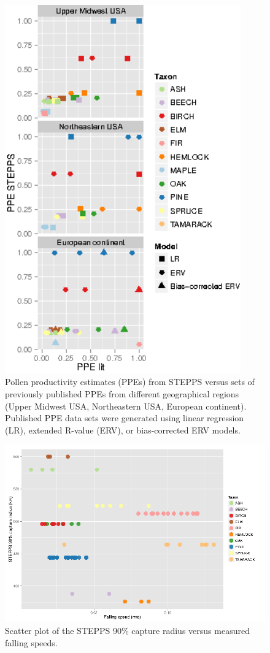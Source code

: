 \begin{figure}
\centering
\includegraphics[width=4in]{figures/PPEs_panels.png}
\caption{Pollen productivity estimates (PPEs) from STEPPS versus sets
  of previously published PPEs from different geographical regions
  (Upper Midwest USA, Northeastern USA, European continent). Published
  PPE data sets were generated using linear regression (LR), extended
  R-value (ERV), or bias-corrected ERV models.}
\label{fig:ppe}
\end{figure}

\begin{figure}
\centering
\includegraphics[width=7in]{figures/SVs_90_single.png}
\caption{Scatter plot of the STEPPS 90\% capture radius versus
  measured falling speeds.}
\label{fig:svs}
\end{figure}

